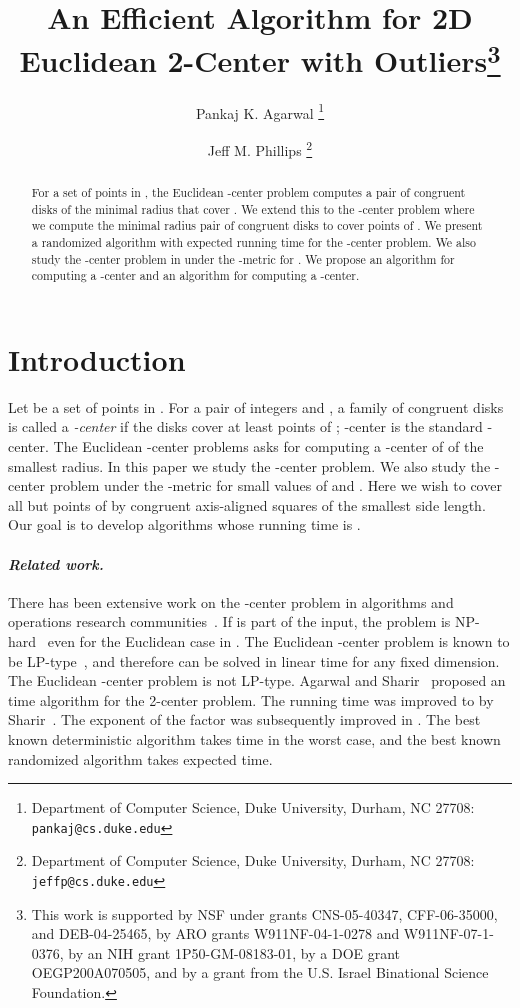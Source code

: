 \documentclass[11pt]{myclass}
\title{An Efficient Algorithm for 2D Euclidean 2-Center with Outliers\thanks{This work is supported by NSF under grants CNS-05-40347, CFF-06-35000, and DEB-04-25465, by ARO grants W911NF-04-1-0278 and W911NF-07-1-0376, by an NIH grant 1P50-GM-08183-01, by a DOE grant OEGP200A070505, and by a grant from the U.S. Israel Binational Science Foundation.}}
\author{Pankaj K. Agarwal
\thanks{Department of Computer Science, Duke University, Durham, NC 27708: \texttt{pankaj@cs.duke.edu}} 
\and Jeff M. Phillips
\thanks{Department of Computer Science, Duke University, Durham, NC 27708: \texttt{jeffp@cs.duke.edu}}
}
\begin{document}
\maketitle

\begin{abstract}
For a set  of  points in , the Euclidean -center problem computes a pair of congruent disks of the minimal radius that cover .  We extend this to the -center problem where we compute the minimal radius pair of congruent disks to cover  points of .  
We present a randomized algorithm with  expected running time for the -center problem.  
We also study the -center problem in  under the -metric for . 
We propose an  algorithm for computing a  -center and an  algorithm for computing a  -center. 
\end{abstract}

\section{Introduction}
Let  be a set of  points in .  For a pair of integers  and , a family of  congruent disks is called a \emph{-center} if the disks cover at least  points of ; -center is the standard -center.  The Euclidean -center problems asks for computing a -center of  of the smallest radius.  In this paper we study the -center problem.
We also study the -center problem under the -metric for small values of  and .  Here we wish to cover all but  points of  by  congruent axis-aligned squares of the smallest side length.  Our goal is to develop algorithms whose running time is .


\paragraph{\textbf{\emph{Related work.}}}
There has been extensive work on the -center problem in algorithms and operations research communities~\cite{AS98,DH02,Hoch95,CKMN01}.  
If  is part of the input, the problem is NP-hard~\cite{MS84} even for the Euclidean case in .  The Euclidean -center problem is known to be LP-type~\cite{MSW96}, and therefore can be solved in linear time for any fixed dimension.  
The Euclidean -center problem is not LP-type.  Agarwal and Sharir~\cite{AS94} proposed an  time algorithm for the 2-center problem.  The running time was improved to  by Sharir~\cite{Sha97}.  The exponent of the  factor was subsequently improved in \cite{Epp97,Chan99}.  The best known deterministic algorithm takes  time in the worst case, and the best known randomized algorithm takes  expected time.  
\end{document}
